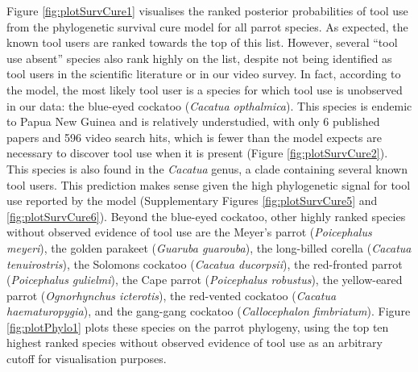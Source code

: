 \documentclass[
  man,floatsintext]{apa6}
\begin{document}
Figure \ref{fig:plotSurvCure1} visualises the ranked posterior probabilities of
tool use from the phylogenetic survival cure model for all parrot species. As
expected, the known tool users are ranked towards the top of this list. However,
several ``tool use absent'' species also rank highly on the list, despite not
being identified as tool users in the scientific literature or in our video
survey. In fact, according to the model, the most likely tool user is a species
for which tool use is unobserved in our data: the blue-eyed cockatoo (\emph{Cacatua
opthalmica}). This species is endemic to Papua New Guinea and is relatively
understudied, with only 6 published papers
and 596 video search hits, which is fewer than the
model expects are necessary to discover tool use when it is present (Figure
\ref{fig:plotSurvCure2}). This species is also found in the \emph{Cacatua} genus, a
clade containing several known tool users. This prediction makes sense given the
high phylogenetic signal for tool use reported by the model (Supplementary
Figures \ref{fig:plotSurvCure5} and \ref{fig:plotSurvCure6}). Beyond the
blue-eyed cockatoo, other highly ranked species without observed evidence of
tool use are the Meyer's parrot (\emph{Poicephalus meyeri}), the golden parakeet
(\emph{Guaruba guarouba}), the long-billed corella (\emph{Cacatua tenuirostris}), the
Solomons cockatoo (\emph{Cacatua ducorpsii}), the red-fronted parrot (\emph{Poicephalus
gulielmi}), the Cape parrot (\emph{Poicephalus robustus}), the yellow-eared parrot
(\emph{Ognorhynchus icterotis}), the red-vented cockatoo (\emph{Cacatua haematuropygia}),
and the gang-gang cockatoo (\emph{Callocephalon fimbriatum}). Figure
\ref{fig:plotPhylo1} plots these species on the parrot phylogeny, using the top
ten highest ranked species without observed evidence of tool use as an arbitrary
cutoff for visualisation purposes.
\end{document}
